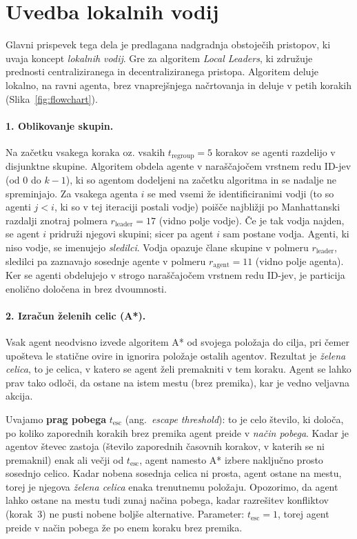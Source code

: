 \documentclass[sigconf,nonacm]{acmart}
\begin{document}
\section{Uvedba lokalnih vodij}

Glavni prispevek tega dela je predlagana nadgradnja obstoječih pristopov, ki uvaja koncept 
\textit{lokalnih vodij}. Gre za algoritem \textit{Local Leaders}, ki združuje prednosti
centraliziranega in decentraliziranega pristopa. Algoritem deluje lokalno, na ravni agenta, 
brez vnaprejšnjega načrtovanja in deluje v petih korakih (Slika~\ref{fig:flowchart}).

\paragraph{1. Oblikovanje skupin.}
Na začetku vsakega koraka oz. vsakih $t_{\text{regroup}} = 5$ korakov se agenti razdelijo v disjunktne skupine. Algoritem obdela agente v naraščajočem
vrstnem redu ID-jev (od $0$ do $k-1$), ki so agentom dodeljeni na začetku algoritma in se nadalje ne spreminjajo. Za vsakega agenta $i$ se med vsemi že identificiranimi vodji
(to so agenti $j < i$, ki so v tej iteraciji postali vodje) poišče najbližji po Manhattanski razdalji
znotraj polmera $r_{\text{leader}} = 17$ (vidno polje vodje). Če je tak vodja najden, se agent $i$
pridruži njegovi skupini; sicer pa agent $i$ sam postane vodja.
Agenti, ki niso vodje, se imenujejo \textit{sledilci}. Vodja opazuje člane skupine v polmeru
$r_{\text{leader}}$, sledilci pa zaznavajo sosednje agente v polmeru $r_{\text{agent}} = 11$ (vidno polje
agenta). Ker se agenti obdelujejo v strogo naraščajočem vrstnem redu ID-jev, je particija enolično
določena in brez dvoumnosti.

\paragraph{2. Izračun želenih celic (A*).}
Vsak agent neodvisno izvede algoritem A* od svojega položaja do cilja, pri čemer upošteva le statične
ovire in ignorira položaje ostalih agentov. Rezultat je \textit{želena celica}, to je celica, v katero se
agent želi premakniti v tem koraku. Agent se lahko prav tako odloči, da ostane na istem mestu (brez premika), kar
je vedno veljavna akcija.

Uvajamo \textbf{prag pobega} $t_{\text{esc}}$ (ang.\ \textit{escape threshold}): to je celo število, ki
določa, po koliko zaporednih korakih brez premika agent preide v \textit{način pobega}. Kadar je
agentov števec zastoja (število zaporednih časovnih korakov, v katerih se ni premaknil) enak ali večji od
$t_{\text{esc}}$, agent namesto A* izbere naključno prosto sosednjo celico. Kadar nobena sosednja
celica ni prosta, agent ostane na mestu, torej je njegova \textit{želena celica} enaka trenutnemu
položaju. Opozorimo, da agent lahko ostane na mestu tudi zunaj načina pobega, kadar razrešitev
konfliktov (korak~3) ne pusti nobene boljše alternative. Parameter: $t_{\text{esc}} = 1$, torej agent preide v način pobega že po enem koraku brez premika.
\end{document}
